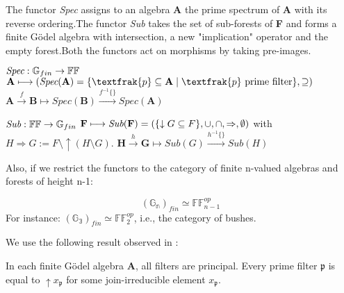The functor \emph{Spec} assigns to an algebra \textbf{A} the prime spectrum of \textbf{A} with its reverse ordering.\newline The functor \emph{Sub} takes the set of sub-forests of \textbf{F} and forms a finite Gödel algebra with intersection, a new "implication" operator and the empty forest.\newline Both the functors act on morphisms by taking pre-images.

\begin{definition}[Spec]
	$\emph{Spec} : \mathbb{G}_{fin} \rightarrow \mathbb{FF}$ \newline
	\newline
			$	\textbf{A} \longmapsto (\emph{Spec}(\textbf{A})  = \{ \textfrak{p}\subseteq \textbf{A} \;|\; \textfrak{p} \text{ prime filter} \}, \supseteq )$ \newline
				$ \textbf{A} \xrightarrow{f} \textbf{B} \longmapsto Spec(\textbf{B}) \xrightarrow{f^{-1}\{\}} Spec(\textbf{A}) $
\end{definition}

\begin{definition}[Sub]
	$ \emph{Sub} :  \mathbb{FF} \rightarrow \mathbb{G}_{fin}$\newline \newline
	 $\textbf{F} \longmapsto \emph{Sub}(\textbf{F}) = (\{\downarrow G \subseteq F\},\cup,\cap,\Rightarrow,\emptyset ) $ with $ H \Rightarrow G := F \setminus \uparrow(H \setminus G) $. \newline
	 $ \textbf{H} \xrightarrow{h} \textbf{G} \longmapsto Sub(G) \xrightarrow{h^{-1}\{\}} Sub(H) $
\end{definition}

Also, if we restrict the functors to the category of finite n-valued algebras and forests of height n-1:

\begin{thm}
	\[ (\mathbb{G_n})_{fin} \simeq \mathbb{FF}^{\textit{op}}_{n-1} \] 
	For instance: $ (\mathbb{G_3})_{fin} \simeq \mathbb{FF}^{\textit{op}}_{2} $, i.e., the category of bushes.
\end{thm}

We use the following result observed in \cite{recursive}:
\begin{lem}
	In each finite Gödel algebra \textbf{A}, all filters  are principal. \newline Every prime filter $\mathfrak{p}$ is equal to $\uparrow x_\mathfrak{p}$ for some join-irreducible element $x_\mathfrak{p}$.
\end{lem}

